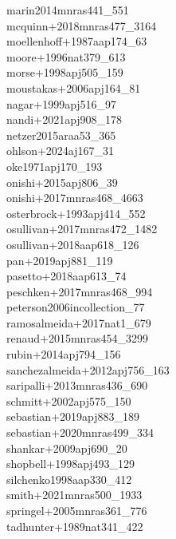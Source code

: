 \documentclass{article}
\begin{document}
\noindent marin2014mnras441_551 \\
\noindent mcquinn+2018mnras477_3164 \\
\noindent moellenhoff+1987aap174_63 \\
\noindent moore+1996nat379_613 \\
\noindent morse+1998apj505_159 \\
\noindent moustakas+2006apj164_81 \\
\noindent nagar+1999apj516_97 \\
\noindent nandi+2021apj908_178 \\
\noindent netzer2015araa53_365 \\
\noindent ohlson+2024aj167_31 \\
\noindent oke1971apj170_193 \\
\noindent onishi+2015apj806_39 \\
\noindent onishi+2017mnras468_4663 \\
\noindent osterbrock+1993apj414_552 \\
\noindent osullivan+2017mnras472_1482 \\
\noindent osullivan+2018aap618_126 \\
\noindent pan+2019apj881_119 \\
\noindent pasetto+2018aap613_74 \\
\noindent peschken+2017mnras468_994 \\
\noindent peterson2006incollection_77 \\
\noindent ramosalmeida+2017nat1_679 \\
\noindent renaud+2015mnras454_3299 \\
\noindent rubin+2014apj794_156 \\
\noindent sanchezalmeida+2012apj756_163 \\
\noindent saripalli+2013mnras436_690 \\
\noindent schmitt+2002apj575_150 \\
\noindent sebastian+2019apj883_189 \\
\noindent sebastian+2020mnras499_334 \\
\noindent shankar+2009apj690_20 \\
\noindent shopbell+1998apj493_129 \\
\noindent silchenko1998aap330_412 \\
\noindent smith+2021mnras500_1933 \\
\noindent springel+2005mnras361_776 \\
\noindent tadhunter+1989nat341_422 \\
\end{document}
